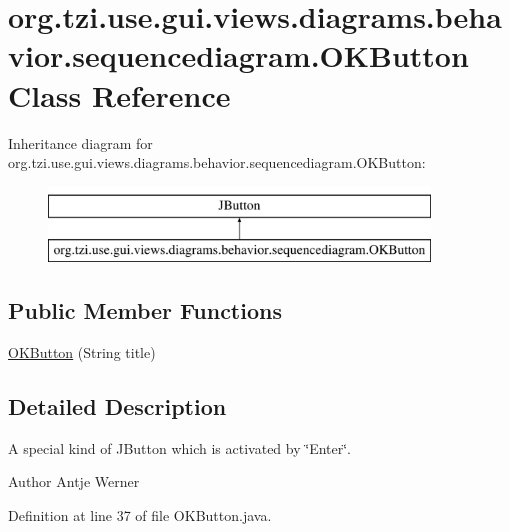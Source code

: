 \hypertarget{classorg_1_1tzi_1_1use_1_1gui_1_1views_1_1diagrams_1_1behavior_1_1sequencediagram_1_1_o_k_button}{\section{org.\-tzi.\-use.\-gui.\-views.\-diagrams.\-behavior.\-sequencediagram.\-O\-K\-Button Class Reference}
\label{classorg_1_1tzi_1_1use_1_1gui_1_1views_1_1diagrams_1_1behavior_1_1sequencediagram_1_1_o_k_button}
}
Inheritance diagram for org.\-tzi.\-use.\-gui.\-views.\-diagrams.\-behavior.\-sequencediagram.\-O\-K\-Button\-:\begin{figure}[H]
\begin{center}
\leavevmode
\includegraphics[height=2.000000cm]{classorg_1_1tzi_1_1use_1_1gui_1_1views_1_1diagrams_1_1behavior_1_1sequencediagram_1_1_o_k_button}
\end{center}
\end{figure}
\subsection*{Public Member Functions}
\begin{DoxyCompactItemize}
\item 
\hyperlink{classorg_1_1tzi_1_1use_1_1gui_1_1views_1_1diagrams_1_1behavior_1_1sequencediagram_1_1_o_k_button_abf719191b065dee25a60d87fe783d98a}{O\-K\-Button} (String title)
\end{DoxyCompactItemize}


\subsection{Detailed Description}
A special kind of J\-Button which is activated by \char`\"{}\-Enter\char`\"{}.

\begin{DoxyAuthor}{Author}
Antje Werner 
\end{DoxyAuthor}


Definition at line 37 of file O\-K\-Button.\-java.



